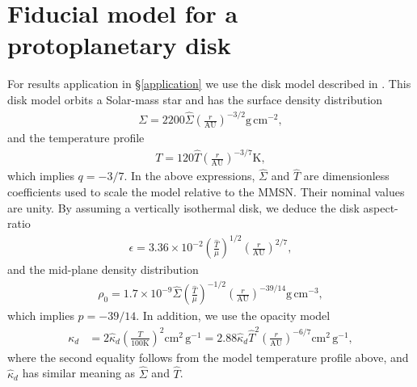 \section{Fiducial model for a protoplanetary disk}\label{mmsn}
For results application in \S\ref{application} we use the disk model
described in \cite{chiang10}. This disk model orbits a Solar-mass star and 
has the surface density distribution
\begin{align}\label{mmsn_sigma}
  \Sigma = 2200
  \hat{\Sigma}\left(\frac{r}{\mathrm{AU}}\right)^{-3/2}\mathrm{g}\,\mathrm{cm}^{-2},  
\end{align}
and the temperature profile
\begin{align}\label{mmsn_temp}
  T = 120\hat{T}\left(\frac{r}{\mathrm{AU}}\right)^{-3/7} \mathrm{K},
\end{align}
which implies $q=-3/7$. In the above expressions, $\hat{\Sigma}$ and
$\hat{T}$ are dimensionless coefficients used to scale the model
relative to the MMSN. Their nominal values are unity. By assuming a
vertically isothermal disk, we deduce the disk aspect-ratio 
\begin{align}\label{mmsn_epsilon}
  \epsilon =
  3.36\times10^{-2}\left(\frac{\hat{T}}{\mu}\right)^{1/2}\left(\frac{r}{\mathrm{AU}}\right)^{2/7}, 
\end{align}
and the mid-plane density distribution 
\begin{align}
\rho_0 = 1.7\times10^{-9}
  \hat{\Sigma}\left(\frac{\hat{T}}{\mu}\right)^{-1/2}\left(\frac{r}{\mathrm{AU}}\right)^{-39/14}\mathrm{g}\,\mathrm{cm}^{-3},
\end{align}
which implies $p=-39/14$. 
In addition, we use the opacity model
 \begin{align}
   \kappa_d &= 2 \hat{\kappa}_d \left(\frac{T}{100\mathrm{K}}\right)^2
   \mathrm{cm}^2\,\mathrm{g}^{-1}
    =
   2.88\hat{\kappa}_d\hat{T}^2\left(\frac{r}{\mathrm{AU}}\right)^{-6/7}\mathrm{cm}^2\,\mathrm{g}^{-1},   
 \end{align}
\citep{bell94} where the second equality follows from the model
temperature profile above, and $\hat{\kappa}_d$ has similar meaning as
$\hat{\Sigma}$ and $\hat{T}$.  
